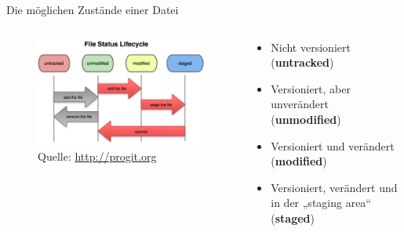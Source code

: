 \begin{frame}{Die möglichen Zustände einer Datei}
  \begin{columns}
    \begin{column}{0.45\textwidth}
      \begin{figure}
        \includegraphics[width=\textwidth]{img/file_lifecycle}
        \caption[format=empty]{Quelle: \url{http://progit.org}}
      \end{figure}
    \end{column}
    \begin{column}{0.65\textwidth}
      \begin{itemize}
        \item Nicht versioniert (\textbf{untracked})
        \item Versioniert, aber unverändert (\textbf{unmodified})
        \item Versioniert und verändert (\textbf{modified})
        \item Versioniert, verändert und in der „staging area“ (\textbf{staged})
      \end{itemize}
    \end{column}
  \end{columns}
\end{frame}

